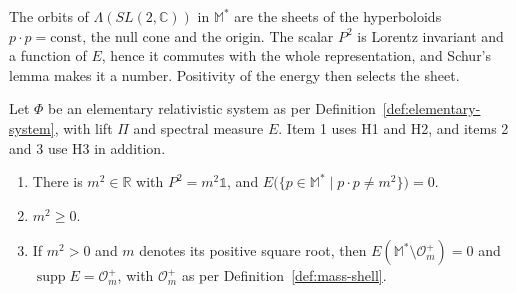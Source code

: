 The orbits of $\Lambda(SL(2,\mathbb{C}))$ in $\mathbb{M}^*$ are the sheets of the hyperboloids $p\cdot p=\mathrm{const}$, the null cone and the origin. The scalar $P^2$ is Lorentz invariant and a function of $E$, hence it commutes with the whole representation, and Schur's lemma makes it a number. Positivity of the energy then selects the sheet.

\begin{proposition}\label{prop:mass-shell}
	Let $\Phi$ be an elementary relativistic system as per Definition~\ref{def:elementary-system}, with lift $\Pi$ and spectral measure $E$. Item 1 uses H1 and H2, and items 2 and 3 use H3 in addition.
	\begin{enumerate}
		\item There is $m^2\in\mathbb{R}$ with $P^2=m^2\mathbb{1}$, and $E\big(\{p\in\mathbb{M}^*\mid p\cdot p\neq m^2\}\big)=0$.
		\item $m^2\geq0$.
		\item If $m^2>0$ and $m$ denotes its positive square root, then $E(\mathbb{M}^*\setminus\mathcal{O}_m^+)=0$ and $\operatorname{supp}E=\mathcal{O}_m^+$, with $\mathcal{O}_m^+$ as per Definition~\ref{def:mass-shell}.
	\end{enumerate}
\end{proposition}

